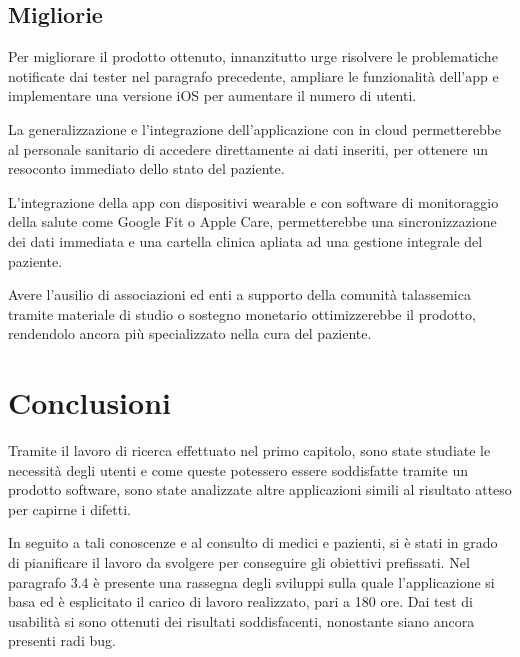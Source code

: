 \documentclass[12pt,a4paper,openright,twoside]{report}
\begin{document}
\section{Migliorie}
Per migliorare il prodotto ottenuto, innanzitutto urge risolvere le problematiche notificate dai tester nel paragrafo precedente, ampliare le funzionalità dell’app e implementare una versione iOS per aumentare il numero di utenti. 

La generalizzazione e l’integrazione dell’applicazione con in cloud permetterebbe al personale sanitario di accedere direttamente ai dati inseriti, per ottenere un resoconto immediato dello stato del paziente. 

L’integrazione della app con dispositivi wearable e con software di monitoraggio della salute come Google Fit o Apple Care, permetterebbe una sincronizzazione dei dati immediata e una cartella clinica apliata ad una gestione integrale del paziente. 

Avere l’ausilio di associazioni ed enti a supporto della comunità talassemica tramite materiale di studio o sostegno monetario ottimizzerebbe il prodotto, rendendolo ancora più specializzato nella cura del paziente.

\chapter*{Conclusioni}



Tramite il lavoro di ricerca effettuato nel primo capitolo, sono state studiate le necessità degli utenti e come queste potessero essere soddisfatte tramite un prodotto software, sono state analizzate altre applicazioni simili al risultato atteso per capirne i difetti. 

In seguito a tali conoscenze e al consulto di medici e pazienti, si è stati in grado di pianificare il lavoro da svolgere per conseguire gli obiettivi prefissati.
Nel paragrafo 3.4 è presente una rassegna degli sviluppi sulla quale l’applicazione si basa ed è esplicitato il carico di lavoro realizzato, pari a 180 ore.  Dai test di usabilità si sono ottenuti dei risultati soddisfacenti, nonostante siano ancora presenti radi bug.
\end{document}
